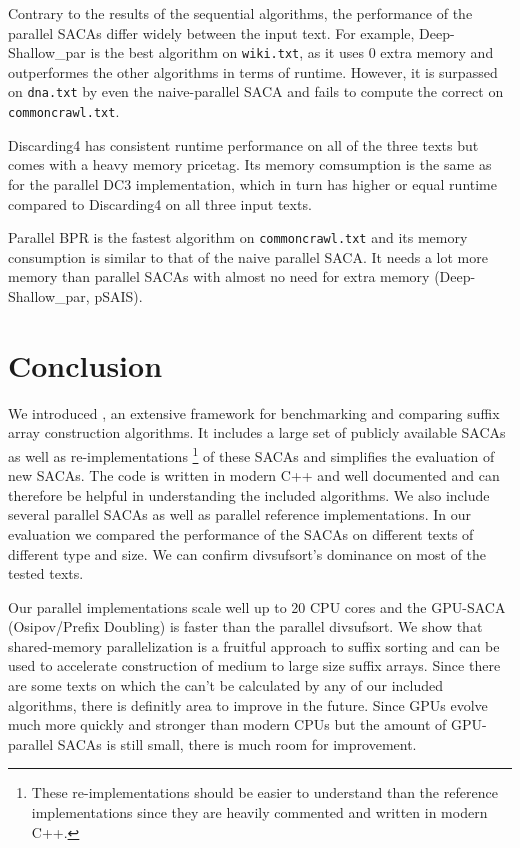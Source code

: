 Contrary to the results of the sequential algorithms, the performance of the parallel SACAs differ widely between the input text.
For example, Deep-Shallow\_par is the best algorithm on \texttt{wiki.txt},
as it uses 0 extra memory and outperformes the other algorithms in terms of runtime.
However, it is surpassed on \texttt{dna.txt} by even the naive-parallel SACA and fails to compute the correct \sa on \texttt{commoncrawl.txt}.

Discarding4 has consistent runtime performance on all of the three texts but comes with a heavy memory pricetag.
Its memory comsumption is the same as for the parallel DC3 implementation,
which in turn has higher or equal runtime compared to Discarding4 on all three input texts.

Parallel BPR is the fastest algorithm on \texttt{commoncrawl.txt} and its memory consumption is similar to that of the naive parallel SACA.
It needs a lot more memory than parallel SACAs with almost no need for extra memory (Deep-Shallow\_par, pSAIS).


\section{Conclusion}

We introduced \sacabench, an extensive framework for benchmarking and comparing suffix array construction algorithms.
It includes a large set of publicly available SACAs as well as re-implementations%
\footnote{These re-implementations should be easier to understand than the reference implementations since they are heavily commented and written in modern C++.}
of these SACAs and simplifies the evaluation of new SACAs.
The code is written in modern C++ and well documented and can therefore be helpful in understanding the included algorithms.
We also include several parallel SACAs as well as parallel reference implementations.
In our evaluation we compared the performance of the SACAs on different texts of different type and size.
We can confirm divsufsort's dominance on most of the tested texts.

Our parallel implementations scale well up to 20 CPU cores and the GPU-SACA (Osipov/Prefix Doubling) is faster than the parallel divsufsort.
We show that shared-memory parallelization is a fruitful approach to suffix sorting
and can be used to accelerate construction of medium to large size suffix arrays.
Since there are some texts on which the \sa can't be calculated by any of our included algorithms,
there is definitly area to improve in the future.
Since GPUs evolve much more quickly and stronger than modern CPUs
but the amount of GPU-parallel SACAs is still small, there is much room for improvement.

